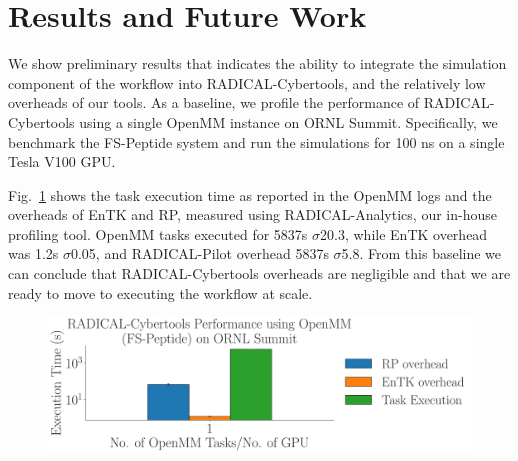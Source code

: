 \documentclass[conference,final]{IEEEtran}
\begin{document}
\section{Results and Future Work}

We show preliminary results that indicates the ability to integrate the
simulation component of the workflow into RADICAL-Cybertools, and the
relatively low overheads of our tools.  As a baseline, we profile the
performance of RADICAL-Cybertools using a single OpenMM instance on ORNL
Summit. Specifically, we benchmark the FS-Peptide system and run the
simulations for 100 ns on a single Tesla V100 GPU. 

Fig.~\ref{fig:single_openmm} shows the task execution time as reported in the
OpenMM logs and the overheads of EnTK and RP, measured using
RADICAL-Analytics, our in-house profiling tool. OpenMM tasks executed for
5837s $\sigma$20.3, while EnTK overhead was 1.2s $\sigma$0.05, and
RADICAL-Pilot overhead 5837s $\sigma$5.8. From this baseline we can
conclude that RADICAL-Cybertools overheads are negligible and that we are
ready to move to executing the workflow at scale.

\begin{figure}
    \centering
    \includegraphics[width=.8\textwidth]{single_openmm}
    \caption{}
    \label{fig:single_openmm}
\end{figure}





\end{document}
